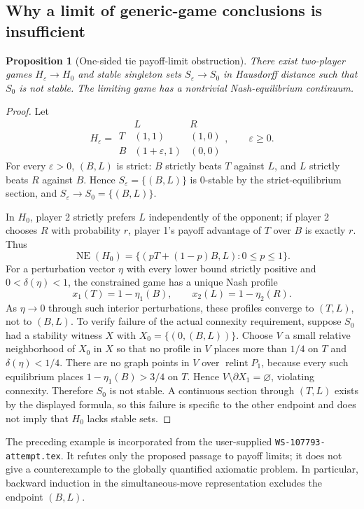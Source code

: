 \documentclass[11pt]{article}
\newtheorem{proposition}[theorem]{Proposition}
\theoremstyle{definition}
\newcommand{\NE}{\operatorname{NE}}
\begin{document}
\subsection{Why a limit of generic-game conclusions is insufficient}\label{sec:payofflimit}
\begin{proposition}[One-sided tie payoff-limit obstruction]\label{prop:limit2}
There exist two-player games $H_\varepsilon\to H_0$ and stable singleton
sets $S_\varepsilon\to S_0$ in Hausdorff distance such that $S_0$ is
not stable. The limiting game has a nontrivial Nash-equilibrium continuum.
\end{proposition}
\begin{proof}
Let
\[
H_\varepsilon=\begin{array}{c|cc}
 &L&R\\\hline
 T&(1,1)&(1,0)\\
 B&(1+\varepsilon,1)&(0,0)
\end{array},\qquad \varepsilon\ge0.
\]
For every $\varepsilon>0$, $(B,L)$ is strict: $B$ strictly beats $T$
against $L$, and $L$ strictly beats $R$ against $B$. Hence
$S_\varepsilon=\{(B,L)\}$ is $0$-stable by the strict-equilibrium
section, and $S_\varepsilon\to S_0=\{(B,L)\}$.

In $H_0$, player 2 strictly prefers $L$ independently of the opponent;
if player 2 chooses $R$ with probability $r$, player 1's payoff
advantage of $T$ over $B$ is exactly $r$. Thus
\[
 \NE(H_0)=\{(pT+(1-p)B,L):0\le p\le1\}.
\]
For a perturbation vector $\eta$ with every lower bound strictly
positive and $0<\delta(\eta)<1$, the constrained game has a unique
Nash profile
\[
 x_1(T)=1-\eta_1(B),\qquad x_2(L)=1-\eta_2(R).
\]
As $\eta\to0$ through such interior perturbations, these profiles
converge to $(T,L)$, not to $(B,L)$. To verify failure of the actual
connexity requirement, suppose $S_0$ had a stability witness $X$ with
$X_0=\{(0,(B,L))\}$. Choose $V$ a small relative neighborhood of
$X_0$ in $X$ so that no profile in $V$ places more than $1/4$ on $T$
and $\delta(\eta)<1/4$. There are no graph points in $V$ over
$\operatorname{relint}P_1$, because every such equilibrium places
$1-\eta_1(B)>3/4$ on $T$. Hence
$V\setminus\partial X_1=\varnothing$, violating connexity.
Therefore $S_0$ is not stable. A continuous section through $(T,L)$
exists by the displayed formula, so this failure is specific to the
other endpoint and does not imply that $H_0$ lacks stable sets.
\end{proof}

The preceding example is incorporated from the user-supplied
\texttt{WS-107793-attempt.tex}. It refutes only the proposed passage to
payoff limits; it does not give a counterexample to the globally
quantified axiomatic problem. In particular, backward induction in the
simultaneous-move representation excludes the endpoint $(B,L)$.
\end{document}
